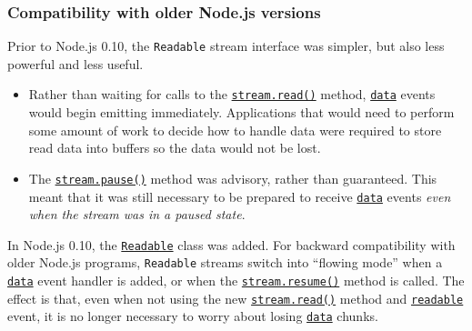 \begin{Shaded}
\begin{Highlighting}[]
\OperatorTok{,}
  \KeywordTok{=\textgreater{}}\NormalTok{ \{}
    \OperatorTok{,} \NormalTok{)}\OperatorTok{;}
\NormalTok{  \})}
  \KeywordTok{=\textgreater{}}\NormalTok{ \{}
    \OperatorTok{;}
\NormalTok{()}\OperatorTok{;}
\NormalTok{  \})}\OperatorTok{;}
\end{Highlighting}
\end{Shaded}

\subsubsection{Compatibility with older Node.js
versions}\label{compatibility-with-older-node.js-versions}

Prior to Node.js 0.10, the \texttt{Readable} stream interface was
simpler, but also less powerful and less useful.

\begin{itemize}
\tightlist
\item
  Rather than waiting for calls to the
  \hyperref[readablereadsize]{\texttt{stream.read()}} method,
  \hyperref[event-data]{\texttt{\textquotesingle{}data\textquotesingle{}}}
  events would begin emitting immediately. Applications that would need
  to perform some amount of work to decide how to handle data were
  required to store read data into buffers so the data would not be
  lost.
\item
  The \hyperref[readablepause]{\texttt{stream.pause()}} method was
  advisory, rather than guaranteed. This meant that it was still
  necessary to be prepared to receive
  \hyperref[event-data]{\texttt{\textquotesingle{}data\textquotesingle{}}}
  events \emph{even when the stream was in a paused state}.
\end{itemize}

In Node.js 0.10, the \hyperref[class-streamreadable]{\texttt{Readable}}
class was added. For backward compatibility with older Node.js programs,
\texttt{Readable} streams switch into ``flowing mode'' when a
\hyperref[event-data]{\texttt{\textquotesingle{}data\textquotesingle{}}}
event handler is added, or when the
\hyperref[readableresume]{\texttt{stream.resume()}} method is called.
The effect is that, even when not using the new
\hyperref[readablereadsize]{\texttt{stream.read()}} method and
\hyperref[event-readable]{\texttt{\textquotesingle{}readable\textquotesingle{}}}
event, it is no longer necessary to worry about losing
\hyperref[event-data]{\texttt{\textquotesingle{}data\textquotesingle{}}}
chunks.

